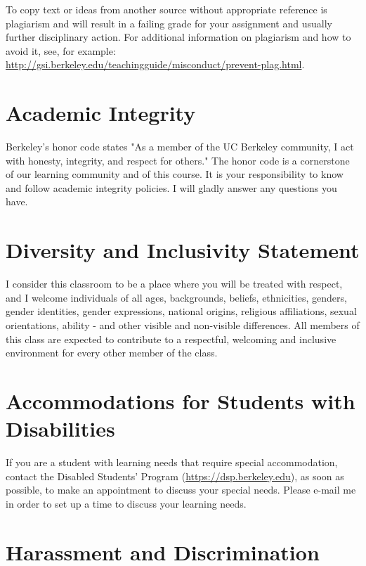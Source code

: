 \documentclass[letterpaper]{inzane_syllabus} %
\begin{document}
To copy text or ideas from another source without appropriate reference is plagiarism and will result in a failing grade for your assignment and usually further disciplinary action. For additional information on plagiarism and how to avoid it, see, for
example: \url{http://gsi.berkeley.edu/teachingguide/misconduct/prevent-plag.html}.

\vspace{0.5cm}
\section{Academic Integrity}

Berkeley's honor code states "As a member of the UC Berkeley community, I act with honesty, integrity, and respect for others." The honor code is a cornerstone of our learning community and of this course. It is your responsibility to know and follow academic integrity policies. I will gladly answer any questions you have.\\

\vspace{0.5cm}
\section{Diversity and Inclusivity Statement}

I consider this classroom to be a place where you will be treated with respect, and I welcome individuals of all ages, backgrounds, beliefs, ethnicities, genders, gender identities, gender expressions, national origins, religious affiliations, sexual orientations, ability - and other visible and non-visible differences. All members of this class are expected to contribute to a respectful, welcoming and inclusive environment for every other member of the class. 

\vspace{0.5cm}
\section{Accommodations for Students with Disabilities}

If you are a student with learning needs that require special accommodation, contact the Disabled Students' Program (\url{https://dsp.berkeley.edu}), as soon as possible, to make an appointment to discuss your special needs.  Please e-mail me in order to set up a time to discuss your learning needs.

\vspace{0.5cm}
\section{Harassment and Discrimination}
\end{document}

